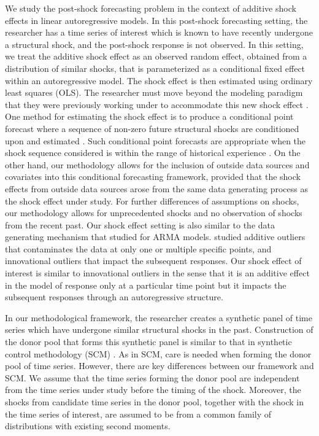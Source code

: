 \documentclass[11pt,3p,review,authoryear]{elsarticle}
\theoremstyle{definition}
\begin{document}
We study the post-shock forecasting problem in the context of additive shock effects in linear autoregressive models. In this post-shock forecasting setting, the researcher has a time series of interest which is known to have recently undergone a structural shock, and the post-shock response is not observed. In this setting, we treat the additive shock effect as an observed random effect, obtained from a distribution of similar shocks, that is parameterized as a conditional fixed effect within an autoregressive model. The shock effect is then estimated using ordinary least squares (OLS). The researcher must move beyond the modeling paradigm that they were previously working under to accommodate this new shock effect \citep{monti2008forecast, svensson2005monetary}. One method for estimating the shock effect is to produce a conditional point forecast where a sequence of non-zero future structural shocks are conditioned upon and estimated \citep{baumeister2014real}. Such conditional point forecasts are appropriate when the shock sequence considered is within the range of historical experience \citep{kilian2017structural}. On the other hand, our methodology allows for the inclusion of outside data sources and covariates into this conditional forecasting framework, provided that the shock effects from outside data sources arose from the same data generating process as the shock effect under study. For further differences of assumptions on shocks, our methodology allows for unprecedented shocks and no observation of shocks from the recent past. Our shock effect setting is also similar to the data generating mechanism that  \cite{tsay1986time} studied for ARMA models. \cite{tsay1986time} studied additive outliers that contaminates the data at only one or multiple specific points, and innovational outliers that impact the subsequent responses. Our shock effect of interest is similar to innovational  outliers  in the sense that it is an additive effect in the model of response only at a particular time point but it impacts the subsequent responses through an autoregressive structure.

In our methodological framework, the researcher creates a synthetic panel of time series which have undergone similar structural shocks in the past. Construction of the donor pool that forms this synthetic panel is similar to that in synthetic control methodology (SCM) \citep{abadie2010synthetic}. As in SCM, care is needed when forming the donor pool of time series. However, there are key differences between our framework and SCM. We assume that the time series forming the donor pool are independent from the time series under study before the timing of the shock. Moreover, the shocks from candidate time series in the donor pool, together with the shock in the time series of interest, are assumed to be  from a common family of distributions with existing second moments. 
\end{document}
